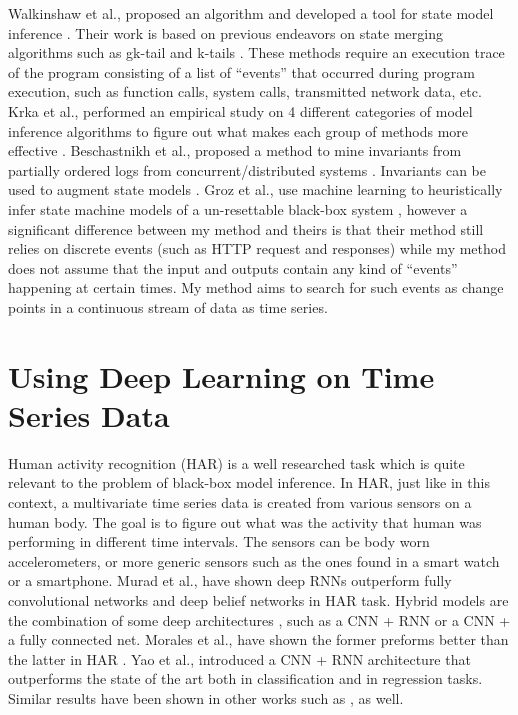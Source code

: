 Walkinshaw et al., proposed an algorithm and developed a tool for state model inference \cite{walkinshaw2016inferring}. Their work is based on previous endeavors on state merging algorithms such as gk-tail and k-tails \cite{lorenzoli2008automatic, biermann1972synthesis}. These methods require an execution trace of the program consisting of a list of ``events'' that occurred during program execution, such as function calls, system calls, transmitted network data, etc. Krka et al., performed an empirical study on 4 different categories of model inference algorithms to figure out what makes each group of methods more effective \cite{krka2014automatic}. Beschastnikh et al., proposed a method to mine invariants from partially ordered logs from concurrent/distributed systems \cite{beschastnikh2011mining}. Invariants can be used to augment state models \cite{beschastnikh2014inferring, beschastnikh2011leveraging}. Groz et al., use machine learning to heuristically infer state machine models of a un-resettable black-box system \cite{groz2018revisiting}, however a significant difference between my method and theirs is that their method still relies on discrete events (such as HTTP request and responses) while my method does not assume that the input and outputs contain any kind of ``events'' happening at certain times. My method aims to search for such events as change points in a continuous stream of data as time series. %


\section{Using Deep Learning on Time Series Data} \label{sec:related_work_har}
Human activity recognition (HAR) is a well researched task which is quite relevant to the problem of black-box model inference. In HAR, just like in this context, a multivariate time series data is created from various sensors on a human body. 
The goal is to figure out what was the activity that human was performing in different time intervals. The sensors can be body worn accelerometers, or more generic sensors such as the ones found in a smart watch or a smartphone. 
Murad et al., \cite{murad2017deep} have shown deep RNNs outperform fully convolutional networks and deep belief networks in HAR task.
Hybrid models are the combination of some deep architectures \cite{wang2019deep}, such as a CNN + RNN or a CNN + a fully connected net. Morales et al., have shown the former preforms better than the latter in HAR \cite{morales2016deep}. Yao et al., \cite{deepsense} introduced a CNN + RNN architecture that outperforms the state of the art both in classification and in regression tasks. Similar results have been shown in other works such as \cite{Ordonez2016, singh2017transforming, zheng2016exploiting}, as well.


